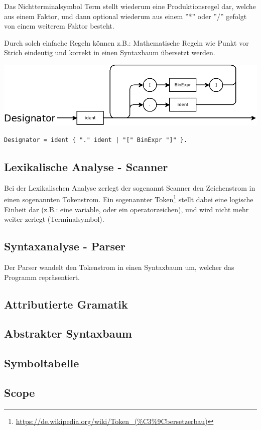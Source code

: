 Das Nichtterminalsymbol Term stellt wiederum eine Produktionsregel dar, welche aus einem Faktor, und dann optional wiederum aus einem ''*'' oder ''/'' gefolgt von einem weiterem Faktor besteht.

Durch solch einfache Regeln können z.B.: Mathematische Regeln wie Punkt vor Strich eindeutig und korrekt in einen Syntaxbaum übersetzt werden.

\includegraphics[scale=0.5]{./media/images/compiler/ebnf_designator.png}
\begin{lstlisting}[language=EBNF]
Designator = ident { "." ident | "[" BinExpr "]" }.
\end{lstlisting}



\newpage

\subsection{Lexikalische Analyse - Scanner}

Bei der Lexikalischen Analyse zerlegt der sogenannt Scanner den Zeichenstrom in einen sogenannten Tokenstrom. Ein sogenannter Token\footnote{\url{https://de.wikipedia.org/wiki/Token_(\%C3\%9Cbersetzerbau)}} stellt dabei eine logische Einheit dar (z.B.: eine variable, oder ein operatorzeichen), und wird nicht mehr weiter zerlegt (Terminalsymbol).

\subsection{Syntaxanalyse - Parser}

Der Parser wandelt den Tokenstrom in einen Syntaxbaum um, welcher das Programm repräsentiert.

\subsection{Attributierte Gramatik}

\subsection{Abstrakter Syntaxbaum}

\subsection{Symboltabelle}

\subsection{Scope}